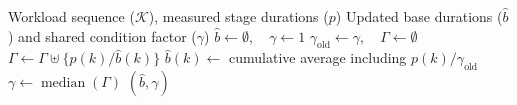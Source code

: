 \begin{algorithm}[t]
\caption{Online Update of Stage-Duration Estimates}
\label{alg:duration-update}
\footnotesize
\renewcommand{\algorithmicrequire}{\textbf{Input:}}
\renewcommand{\algorithmicensure}{\textbf{Output:}}
\begin{algorithmic}[1]
\Require Workload sequence ($\mathcal K$), measured stage durations ($p$)
\Ensure Updated base durations ($\hat b$) and shared condition factor ($\gamma$)
\State $\hat b\gets\emptyset,\quad \gamma\gets1$ \label{alg:pe:init}
\State
{}
  \State $\gamma_{\mathrm{old}}\gets\gamma,\quad \Gamma\gets\emptyset$ \label{alg:pe:snapshot}
   \label{alg:pe:loop}
     \label{alg:pe:observed}
      \State $\Gamma\gets\Gamma\uplus\{p(k)/\hat b(k)\}$ \label{alg:pe:ratio}
    \EndIf
    \State $\hat b(k)\gets$ cumulative average including $p(k)/\gamma_{\mathrm{old}}$ \label{alg:pe:base}
  \EndFor
  \If{$\Gamma\neq\emptyset$} \label{alg:pe:condition}
    \State $\gamma\gets\operatorname{median}(\Gamma)$ \label{alg:pe:gamma}
  \EndIf
  \State \Return $(\hat b,\gamma)$ \label{alg:pe:return}
\EndProcedure
\end{algorithmic}
\end{algorithm}

